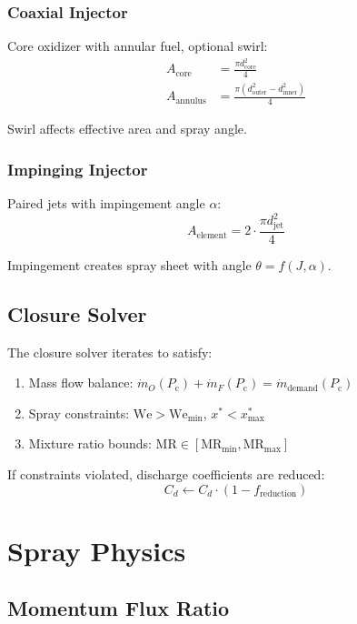 \documentclass[12pt,a4paper]{article}
\newcommand{\mdot}{\dot{m}}
\newcommand{\Pc}{P_{\text{c}}}
\newcommand{\MR}{\text{MR}}
\begin{document}
\subsubsection{Coaxial Injector}

Core oxidizer with annular fuel, optional swirl:
\begin{align}
A_{\text{core}} &= \frac{\pi d_{\text{core}}^2}{4} \\
A_{\text{annulus}} &= \frac{\pi (d_{\text{outer}}^2 - d_{\text{inner}}^2)}{4}
\end{align}

Swirl affects effective area and spray angle.

\subsubsection{Impinging Injector}

Paired jets with impingement angle $\alpha$:
\begin{equation}
A_{\text{element}} = 2 \cdot \frac{\pi d_{\text{jet}}^2}{4}
\end{equation}

Impingement creates spray sheet with angle $\theta = f(J, \alpha)$.

\subsection{Closure Solver}

The closure solver iterates to satisfy:
\begin{enumerate}
    \item Mass flow balance: $\mdot_O(\Pc) + \mdot_F(\Pc) = \mdot_{\text{demand}}(\Pc)$
    \item Spray constraints: $\text{We} > \text{We}_{\min}$, $x^* < x^*_{\max}$
    \item Mixture ratio bounds: $\MR \in [\MR_{\min}, \MR_{\max}]$
\end{enumerate}

If constraints violated, discharge coefficients are reduced:
\begin{equation}
C_d \leftarrow C_d \cdot (1 - f_{\text{reduction}})
\end{equation}

\section{Spray Physics}

\subsection{Momentum Flux Ratio}
\end{document}
